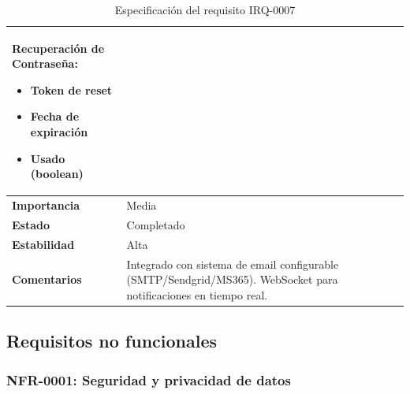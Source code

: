 \documentclass[11pt, a4paper]{article}
\begin{document}
\begin{table}[H]
\begin{tabular}{|p{4cm}|p{10cm}|}
    \textbf{Recuperación de Contraseña:}
    \begin{itemize}
        \item Token de reset
        \item Fecha de expiración
        \item Usado (boolean)
    \end{itemize} \\
    \hline
    \textbf{Importancia} & Media \\
    \hline
    \textbf{Estado} & Completado \\
    \hline
    \textbf{Estabilidad} & Alta \\
    \hline
    \textbf{Comentarios} & Integrado con sistema de email configurable (SMTP/Sendgrid/MS365). WebSocket para notificaciones en tiempo real. \\
    \hline
    \end{tabular}
    \caption{Especificación del requisito IRQ-0007}
\end{table}

\subsection{Requisitos no funcionales}

\subsubsection{NFR-0001: Seguridad y privacidad de datos}
\end{document}
